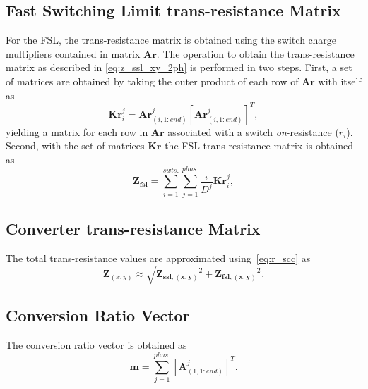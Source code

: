 \subsection{Fast Switching Limit trans-resistance Matrix}
For the FSL, the trans-resistance matrix is obtained using the switch charge multipliers
contained in matrix $\mathbf{Ar}$. The operation to obtain the trans-resistance matrix as described
in \eqref{eq:z_ssl_xy_2ph} is performed in two steps. First, a set of matrices are obtained by taking the outer product
of each row of $\mathbf{Ar}$ with itself as
\begin{equation}
 \mathbf{Kr}_i^j = \mathbf{Ar}_{(i,1:end)}^j [\mathbf{Ar}_{(i,1:end)}^j]^T,
 \label{eq:Kr_matrix}
\end{equation}
yielding a matrix for each row in $\mathbf{Ar}$ associated with a switch \emph{on}-resistance ($r_{i}$). Second, with the set of matrices $\mathbf{Kr}$ the FSL trans-resistance matrix is obtained as
\begin{equation}
 \mathbf{Z_{fsl}} =  \sum_{i=1}^{swts.} \sum_{j=1}^{phas.} \frac{_{i}}{D^j}
\mathbf{Kr}_i^j,
 \label{eq:G_fsl}
\end{equation}

\subsection{Converter trans-resistance Matrix}
The total trans-resistance values are approximated using~\eqref{eq:r_scc} as
\begin{equation}
 \mathbf{Z}_{(x,y)} \approx \sqrt{\mathbf{Z_{ssl,(x,y)}}^2 + \mathbf{Z_{fsl,(x,y)}}^2}.
 \label{eq:G_total}
\end{equation}

\subsection{Conversion Ratio Vector }

The conversion ratio vector is obtained as
\begin{equation}
 \mathbf{m} = \sum_{j=1}^{phas.}[\mathbf{A}^j_{(1,1:end)}]^T.
 \label{eq:m_equation}
\end{equation}

